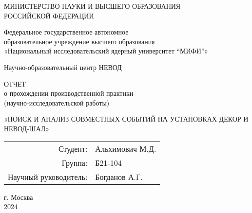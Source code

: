 \thispagestyle{empty}

\begin{center}
    МИНИСТЕРСТВО НАУКИ И ВЫСШЕГО ОБРАЗОВАНИЯ \\ РОССИЙСКОЙ ФЕДЕРАЦИИ

    \vspace{20pt}

    Федеральное государственное автономное \\ образовательное учреждение высшего образования \\
    «Национальный исследовательский ядерный университет “МИФИ”» 

    \vspace{20pt}

    {Научно-образовательный центр НЕВОД}
\end{center}

\vfill

\begin{center}
    ОТЧЕТ \\  
     о прохождении производственной практики \\ (научно-исследовательской работы)

    \vspace{20pt}

    \uppercase{«Поиск и анализ совместных событий 
на установках ДЕКОР и НЕВОД-ШАЛ»
}
\end{center}

\vfill
\hfill
\begin{flushright}
    \begin{tabular}{rl}
        Студент: & Альхимович М.Д. \\[0.5cm]
        Группа: & Б21-104 \\[0.5cm]
        Научный руководитель: & Богданов А.Г. \\
    \end{tabular}
\end{flushright}
\vfill

\begin{center}
    г. Москва\\
 2024
\end{center}